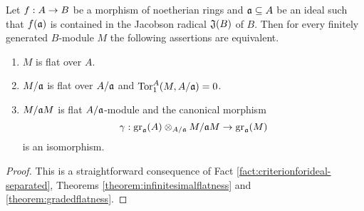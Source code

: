 \begin{corollary}\label{corollary:localjacobsonflatness}
Let $f:A\rightarrow B$ be a morphism of noetherian rings and $\mathfrak{a}\subseteq A$ be an ideal such that $f(\mathfrak{a})$ is contained in the Jacobson radical $\mathfrak{J}(B)$ of $B$. Then for every finitely generated $B$-module $M$ the following assertions are equivalent.
\begin{enumerate}[label=\emph{\textbf{(\roman*)}}, leftmargin=*]
\item $M$ is flat over $A$.
\item $M/\mathfrak{a}$ is flat over $A/\mathfrak{a}$ and $\mathrm{Tor}^A_1(M,A/\mathfrak{a})=0$.
\item $M/\mathfrak{a}M$ is flat $A/\mathfrak{a}$-module and the canonical morphism
$$\gamma:\mathrm{gr}_{\mathfrak{a}}(A)\otimes_{A/\mathfrak{a}}M/\mathfrak{a}M\rightarrow \mathrm{gr}_{\mathfrak{a}}(M)$$
is an isomorphism.
\end{enumerate}
\end{corollary}
\begin{proof}
This is a straightforward consequence of Fact \ref{fact:criterionforideal-separated}, Theorems \ref{theorem:infinitesimalflatness} and \ref{theorem:gradedflatness}.
\end{proof}


